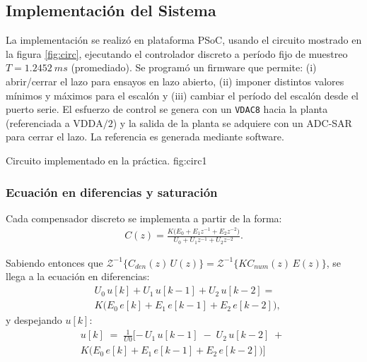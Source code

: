 \subsection{Implementación del Sistema}
La implementación se realizó en plataforma PSoC, usando el circuito mostrado en la figura \ref{fig:circ}, ejecutando el controlador discreto a período fijo de muestreo \(T=\SI{1.2452}{ms}\) (promediado). Se programó un firmware que permite: (i) abrir/cerrar el lazo para ensayos en lazo abierto, (ii) imponer distintos valores mínimos y máximos para el escalón y (iii) cambiar el período del escalón desde el puerto serie. El esfuerzo de control se genera con un \texttt{VDAC8} hacia la planta (referenciada a \(\mathrm{VDDA}/2\)) y la salida de la planta se adquiere con un ADC-SAR para cerrar el lazo. La referencia es generada mediante software.

{Circuito implementado en la práctica.}
{fig:circ}{1}

\subsubsection{Ecuación en diferencias y saturación}
Cada compensador discreto se implementa a partir de la forma:
\begin{equation}
	\label{eq:Cz_form}
	\begin{split}
		C(z)
		= \frac{K\big(E_0 + E_1 z^{-1} + E_2 z^{-2}\big)}
		{U_0 + U_1 z^{-1} + U_2 z^{-2}}.
	\end{split}
\end{equation}

Sabiendo entonces que \(\mathcal{Z}^{-1}\!\big\{C_{den}(z)\,U(z)\big\}=\mathcal{Z}^{-1}\!\big\{KC_{num}(z)\,E(z)\big\}\), se llega a la ecuación en diferencias:
\begin{equation}
	\label{eq:diff_balance}
	\begin{aligned}
		&U_0\,u[k] + U_1\,u[k-1] + U_2\,u[k-2]
		=\\
		 & K\Big(E_0\,e[k] + E_1\,e[k-1] + E_2\,e[k-2]\Big),
	\end{aligned}
\end{equation}
y despejando \(u[k]\):
\begin{equation}
	\label{eq:diff_u}
	\begin{split}
		u[k] \;=\;\frac{1}{U0}[
		-\,U_1\,u[k-1] \;-\; U_2\,u[k-2]
			\;+\; \\K\big(E_0\,e[k] + E_1\,e[k-1] + E_2\,e[k-2]\big)]
	\end{split}
\end{equation}


